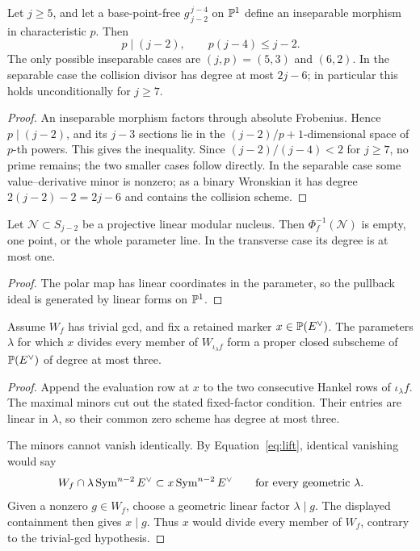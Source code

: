 \begin{lemma}
\label{lem:uniform-collision}%
%
Let \(j\geq5\), and let a base-point-free
\(g^{\,j-4}_{\,j-2}\) on \(\mathbb P^1\) define an inseparable morphism in
characteristic \(p\).  Then
\[
 p\mid(j-2),\qquad p(j-4)\leq j-2.
\]
The only possible inseparable cases are \((j,p)=(5,3)\) and
\((6,2)\).  In the separable case the collision divisor has degree at
most \(2j-6\); in particular this holds unconditionally for \(j\geq7\).
\end{lemma}

\begin{proof}
An inseparable morphism factors through absolute Frobenius.  Hence
\(p\mid(j-2)\), and its \(j-3\) sections lie in the
\((j-2)/p+1\)-dimensional space of \(p\)-th powers.  This gives the
inequality.  Since \((j-2)/(j-4)<2\) for \(j\geq7\), no prime remains;
the two smaller cases follow directly.  In the separable case some
value--derivative minor is nonzero; as a binary Wronskian it has degree
\(2(j-2)-2=2j-6\) and contains the collision scheme.
\end{proof}

\begin{lemma}
\label{lem:linear-modular-pullback}%
%
%
Let \(\mathcal N\subset S_{j-2}\) be a projective linear modular
nucleus.  Then \(\Phi_f^{-1}(\mathcal N)\) is empty, one point, or the
whole parameter line.  In the transverse case its degree is at most
one.
\end{lemma}

\begin{proof}
The polar map has linear coordinates in the parameter, so the
pullback ideal is generated by linear forms on \(\mathbb P^1\).
\end{proof}

\begin{lemma}
\label{lem:old-marker-fixed-factor}%
%
Assume \(W_f\) has trivial gcd, and fix a retained marker
\(x\in\mathbb P(E^\vee)\).  The parameters \(\lambda\) for which \(x\)
divides every member of \(W_{\iota_\lambda f}\) form a proper closed
subscheme of \(\mathbb P(E^\vee)\) of degree at most three.
\end{lemma}

\begin{proof}
Append the evaluation row at \(x\) to the two consecutive Hankel rows
of \(\iota_\lambda f\).  The maximal minors cut out the stated
fixed-factor condition.  Their entries are linear in \(\lambda\), so
their common zero scheme has degree at most three.

The minors cannot vanish identically.  By
Equation~\eqref{eq:lift}, identical vanishing would say
\[
 W_f\cap\lambda\operatorname{Sym}^{n-2}E^\vee
       \subset x\operatorname{Sym}^{n-2}E^\vee
 \qquad\text{for every geometric }\lambda.
\]
Given a nonzero \(g\in W_f\), choose a geometric linear factor
\(\lambda\mid g\).  The displayed containment then gives \(x\mid g\).
Thus \(x\) would divide every member of \(W_f\), contrary to the
trivial-gcd hypothesis.
\end{proof}

